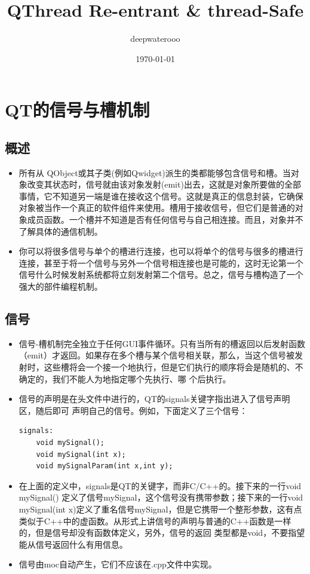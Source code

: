 \documentclass[9pt,b5paper]{article}
\author{deepwaterooo}
\date{\today}
\title{QThread Re-entrant \& thread-Safe}
\begin{document}
\maketitle
\tableofcontents


\section{QT的信号与槽机制}
\label{sec-1}
\subsection{概述}
\label{sec-1-1}
\begin{itemize}
\item 所有从 QObject或其子类(例如Qwidget)派生的类都能够包含信号和槽。当对象改变其状态时，信号就由该对象发射(emit)出去，这就是对象所要做的全部事情，它不知道另一端是谁在接收这个信号。这就是真正的信息封装，它确保对象被当作一个真正的软件组件来使用。槽用于接收信号，但它们是普通的对象成员函数。一个槽并不知道是否有任何信号与自己相连接。而且，对象并不了解具体的通信机制。
\item 你可以将很多信号与单个的槽进行连接，也可以将单个的信号与很多的槽进行连接，甚至于将一个信号与另外一个信号相连接也是可能的，这时无论第一个信号什么时候发射系统都将立刻发射第二个信号。总之，信号与槽构造了一个强大的部件编程机制。
\end{itemize}
\subsection{信号}
\label{sec-1-2}
\begin{itemize}
\item 信号-槽机制完全独立于任何GUI事件循环。只有当所有的槽返回以后发射函数（emit）才返回。如果存在多个槽与某个信号相关联，那么，当这个信号被发射时，这些槽将会一个接一个地执行，但是它们执行的顺序将会是随机的、不确定的，我们不能人为地指定哪个先执行、哪 个后执行。
\item 信号的声明是在头文件中进行的，QT的signals关键字指出进入了信号声明区，随后即可 声明自己的信号。例如，下面定义了三个信号：

\lstset{language=java,label= ,caption= ,numbers=none}
\begin{lstlisting}
signals:  
    void mySignal();  
    void mySignal(int x);  
    void mySignalParam(int x,int y);
\end{lstlisting}

\item 在上面的定义中，signals是QT的关键字，而非C/C++的。接下来的一行void mySignal() 定义了信号mySignal，这个信号没有携带参数；接下来的一行void mySignal(int x)定义了重名信号mySignal，但是它携带一个整形参数，这有点类似于C++中的虚函数。从形式上讲信号的声明与普通的C++函数是一样的，但是信号却没有函数体定义，另外，信号的返回 类型都是void，不要指望能从信号返回什么有用信息。
\item 信号由moc自动产生，它们不应该在.cpp文件中实现。
\end{itemize}
\end{document}
